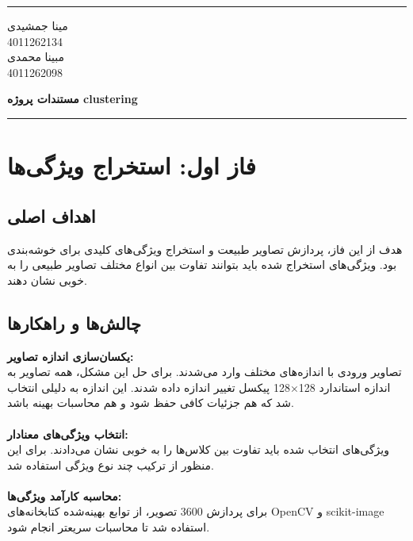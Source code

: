 \documentclass[a4paper,12pt]{article}
\newcommand{\StudentOne}{4011262134}
\newcommand{\StudentTwo}{4011262098}
\newcommand{\NameOne}{مینا جمشیدی}
\newcommand{\NameTwo}{مبینا محمدی}
\newcommand{\ProjectName}{مستندات پروژه clustering}
\let\nobreaksection\section
\renewcommand{\section}{\nobreaksection}  %
\begin{document}
	

	\hrule \medskip
	\begin{minipage}{0.3\textwidth}
		\raggedright
		\small
		\NameOne \\
		\StudentOne \\
		\NameTwo \\
		\StudentTwo
	\end{minipage}
	\begin{minipage}{0.4\textwidth} 
		\centering 
		\large\bfseries
		\ProjectName \\
	\end{minipage}
	\begin{minipage}{0.3\textwidth}
		\raggedleft
		\small
	\end{minipage}
	\medskip\hrule 
	\vspace*{1.5cm}  
	

\section{فاز اول: استخراج ویژگی‌ها}

\subsection*{\textbf{اهداف اصلی}}
هدف از این فاز، پردازش تصاویر طبیعت و استخراج ویژگی‌های کلیدی برای خوشه‌بندی بود. ویژگی‌های استخراج شده باید بتوانند تفاوت بین انواع مختلف تصاویر طبیعی را به خوبی نشان دهند.

\subsection*{\textbf{چالش‌ها و راهکارها}}

\textbf{یکسان‌سازی اندازه تصاویر:}\\
تصاویر ورودی با اندازه‌های مختلف وارد می‌شدند. برای حل این مشکل، همه تصاویر به اندازه استاندارد 128×128 پیکسل تغییر اندازه داده شدند. این اندازه به دلیلی انتخاب شد که هم جزئیات کافی حفظ شود و هم محاسبات بهینه باشد.
\\
\\
\textbf{انتخاب ویژگی‌های معنادار:}\\
ویژگی‌های انتخاب شده باید تفاوت بین کلاس‌ها را به خوبی نشان می‌دادند. برای این منظور از ترکیب چند نوع ویژگی استفاده شد.
\\
\\
\textbf{محاسبه کارآمد ویژگی‌ها:}\\
برای پردازش 3600 تصویر، از توابع بهینه‌شده کتابخانه‌های OpenCV و scikit-image استفاده شد تا محاسبات سریعتر انجام شود.
\end{document}
